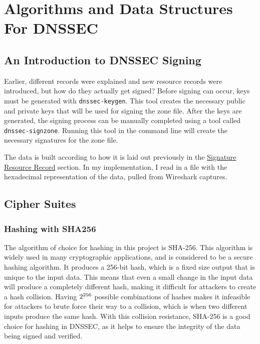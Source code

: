 \chapter{Algorithms and Data Structures For DNSSEC}

\section{An Introduction to DNSSEC Signing}

Earlier, different records were explained and new resource records were introduced, but how do they actually get signed? Before signing can occur, keys must be 
generated with \texttt{dnssec-keygen}. This tool creates the necessary public and private keys that will be used for signing the zone file. 
After the keys are generated, the signing process can be manually completed using a tool called \texttt{dnssec-signzone}. Running this tool in the command line will create 
the necessary signatures for the zone file.


The data is built according to how it is laid out previously in the \hyperref[subsec:rrsig]{Signature Resource Record} section. In my implementation, I read in a file with the 
hexadecimal representation of the data, pulled from Wireshark captures.

\section{Cipher Suites}

\subsection{Hashing with SHA256}

The algorithm of choice for hashing in this project is SHA-256. This algorithm is widely used in many cryptographic applications, and is considered to be a secure 
hashing algorithm. It produces a 256-bit hash, which is a fixed size output that is unique to the input data. This means that even a small change in the input data will 
produce a completely different hash, making it difficult for attackers to create a hash collision. Having $2\textsuperscript{256}$ possible combinations of hashes makes it 
infeasible for attackers to brute force their way to a collision, which is when two different inputs produce the same hash. With this collision resistance, SHA-256 is a 
good choice for hashing in DNSSEC, as it helps to ensure the integrity of the data being signed and verified.

